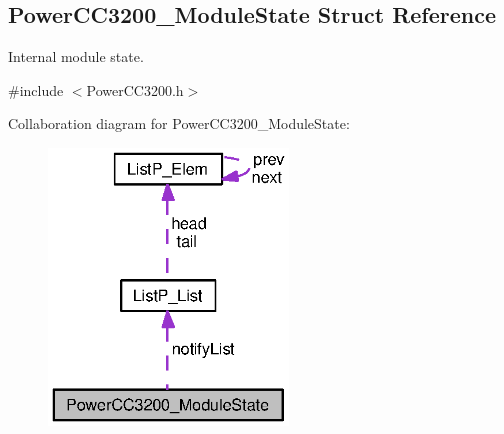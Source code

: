 \subsection{Power\+C\+C3200\+\_\+\+Module\+State Struct Reference}
\label{struct_power_c_c3200___module_state}


Internal module state.  




{\ttfamily \#include $<$Power\+C\+C3200.\+h$>$}



Collaboration diagram for Power\+C\+C3200\+\_\+\+Module\+State\+:
\nopagebreak
\begin{figure}[H]
\begin{center}
\leavevmode
\includegraphics[width=181pt]{struct_power_c_c3200___module_state__coll__graph}
\end{center}
\end{figure}
